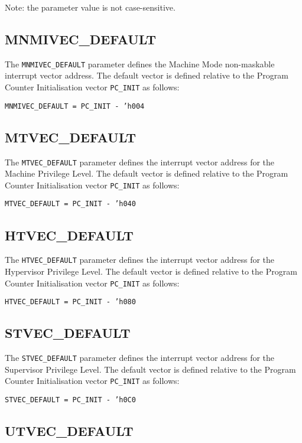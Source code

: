 Note: the parameter value is not case-sensitive.

\subsection{MNMIVEC\_DEFAULT}\label{mnmivec_default}

The \texttt{MNMIVEC\_DEFAULT} parameter defines the Machine Mode non-maskable
interrupt vector address. The default vector is defined relative to the
Program Counter Initialisation vector \texttt{PC\_INIT} as follows:

\texttt{MNMIVEC\_DEFAULT = PC\_INIT - 'h004}

\subsection{MTVEC\_DEFAULT}\label{mtvec_default}

The \texttt{MTVEC\_DEFAULT} parameter defines the interrupt vector address for
the Machine Privilege Level. The default vector is defined relative to
the Program Counter Initialisation vector \texttt{PC\_INIT} as follows:

\texttt{MTVEC\_DEFAULT = PC\_INIT - 'h040}

\subsection{HTVEC\_DEFAULT}\label{htvec_default}

The \texttt{HTVEC\_DEFAULT} parameter defines the interrupt vector address for
the Hypervisor Privilege Level. The default vector is defined relative
to the Program Counter Initialisation vector \texttt{PC\_INIT} as follows:

\texttt{HTVEC\_DEFAULT = PC\_INIT - 'h080}

\subsection{STVEC\_DEFAULT}\label{stvec_default}

The \texttt{STVEC\_DEFAULT} parameter defines the interrupt vector address for
the Supervisor Privilege Level. The default vector is defined relative
to the Program Counter Initialisation vector \texttt{PC\_INIT} as follows:

\texttt{STVEC\_DEFAULT = PC\_INIT - 'h0C0}

\subsection{UTVEC\_DEFAULT}\label{utvec_default}

